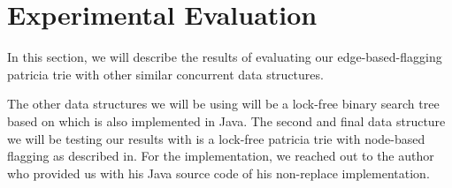 \documentclass[conference]{IEEEtran}
\begin{document}
\section{Experimental Evaluation}
In this section, we will describe the results of evaluating our edge-based-flagging patricia trie with other similar concurrent data structures.

The other data structures we will be using will be a lock-free binary search tree based on\cite{Natarajan2014} which is also implemented in Java\cite{LFBST}. The second and final data structure we will be testing our results with is a lock-free patricia trie with node-based flagging as described in\cite{Shafiei2013}. For the implementation, we reached out to the author who provided us with his Java source code of his non-replace implementation.
\end{document}
